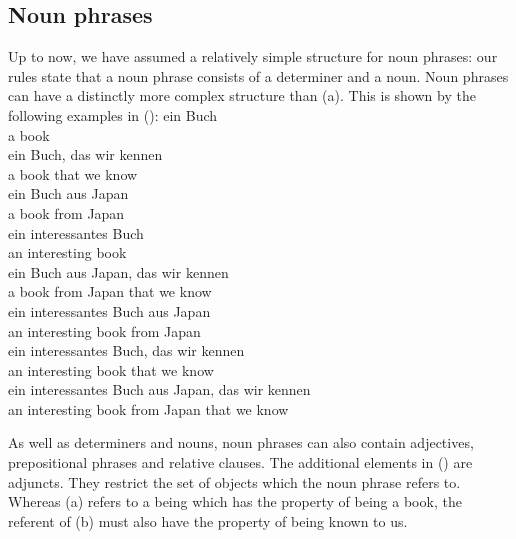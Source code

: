 \subsection{Noun phrases}
\label{sec-psg-np}

Up to now, we have assumed a relatively simple structure for noun phrases: our rules state that a noun phrase consists of a determiner and a
noun. Noun phrases can have a distinctly more complex structure than (a). This is shown by the following examples in ():
\eal
\label{Beispiele-NP-Adjunkte}
\ex 
\gll ein Buch\\
     a   book\\
\ex 
\gll ein Buch, das  wir kennen\\
     a   book  that we  know\\
\ex 
\gll ein Buch aus  Japan\\
     a   book from Japan\\
\ex 
\gll ein interessantes Buch\\
     an   interesting   book\\
\ex 
\gll ein Buch aus  Japan, das  wir kennen\\
     a   book from Japan  that we  know\\
\ex 
\gll ein interessantes Buch aus  Japan\\
     an  interesting   book from Japan\\
\ex 
\gll ein interessantes Buch, das  wir kennen\\
     an  interesting   book  that we  know\\
\ex 
\gll ein interessantes Buch aus  Japan, das  wir kennen\\
     an  interesting   book from Japan  that we  know\\
\zl

\noindent
As well as determiners and nouns, noun phrases can also contain adjectives, prepositional phrases and relative clauses. 
The additional elements in () are adjuncts. They restrict the set of objects which the noun phrase 
refers to. Whereas (a) refers to a being which has the property of being a book, the referent of (b) must
also have the property of being known to us.

